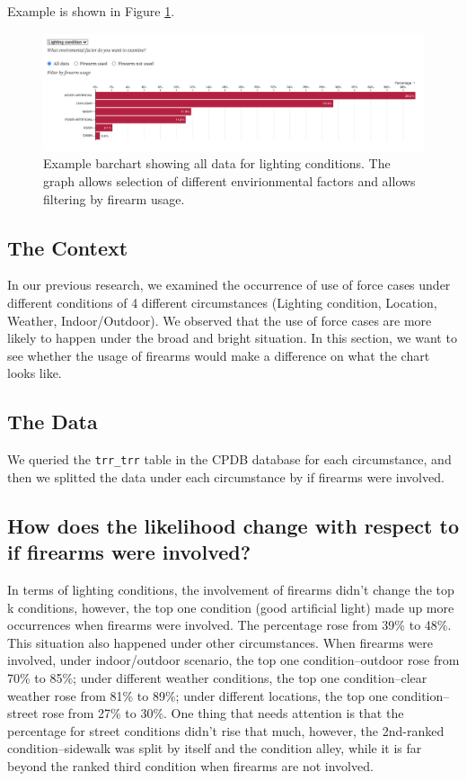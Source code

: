 \documentclass[10pt]{article}
\begin{document}
Example is shown in Figure \ref{barchart}.

\begin{figure}[h]
\centering
\includegraphics[scale=0.45]{barchart}
\caption{Example barchart showing all data for lighting conditions. The graph allows selection of different envirionmental factors and allows filtering by firearm usage.}
\label{barchart}
\end{figure}

\subsection{The Context}

In our previous research, we examined the occurrence of use of force cases under different conditions of 4 different circumstances (Lighting condition, Location, Weather, Indoor/Outdoor). We observed that the use of force cases are more likely to happen under the broad and bright situation. In this section, we want to see whether the usage of firearms would make a difference on what the chart looks like.

\subsection{The Data}

We queried the \texttt{trr\_trr} table in the CPDB database for each circumstance, and then we splitted the data under each circumstance by if firearms were involved.

\subsection{How does the likelihood change with respect to if firearms were involved?}

In terms of lighting conditions, the involvement of firearms didn’t change the top k conditions, however, the top one condition (good artificial light) made up more occurrences when firearms were involved. The percentage rose from 39\% to 48\%. This situation also happened under other circumstances. When firearms were involved, under indoor/outdoor scenario, the top one condition–outdoor rose from 70\% to 85\%; under different weather conditions, the top one condition–clear weather rose from 81\% to 89\%; under different locations, the top one condition–street rose from 27\% to 30\%. One thing that needs attention is that the percentage for street conditions didn’t rise that much, however, the 2nd-ranked condition–sidewalk was split by itself and the condition alley, while it is far beyond the ranked third condition when firearms are not involved.
\end{document}
